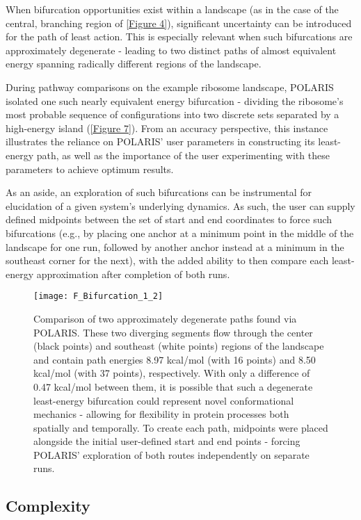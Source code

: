 \documentclass[twocolumn]{biophys-new}
\begin{document}
When bifurcation opportunities exist within a landscape (as in the case of the central, branching region of \autoref{Figure 4}), significant uncertainty can be introduced for the path of least action. This is especially relevant when such bifurcations are approximately degenerate - leading to two distinct paths of almost equivalent energy spanning radically different regions of the landscape.

During pathway comparisons on the example ribosome landscape, POLARIS isolated one such nearly equivalent energy bifurcation - dividing the ribosome's most probable sequence of configurations into two discrete sets separated by a high-energy island (\autoref{Figure 7}). From an accuracy perspective, this instance illustrates the reliance on POLARIS' user parameters in constructing its least-energy path, as well as the importance of the user experimenting with these parameters to achieve optimum results.

As an aside, an exploration of such bifurcations can be instrumental for elucidation of a given system's underlying dynamics. As such, the user can supply defined midpoints between the set of start and end coordinates to force such bifurcations (e.g., by placing one anchor at a minimum point in the middle of the landscape for one run, followed by another anchor instead at a minimum in the southeast corner for the next), with the added ability to then compare each least-energy approximation after completion of both runs.

\setcounter{figure}{6} 
\begin{figure}[hbt!]
\centering
\texttt{[image: F\_Bifurcation\_1\_2]}
\caption{Comparison of two approximately degenerate paths found via POLARIS. These two diverging segments flow through the center (black points) and southeast (white points) regions of the landscape and contain path energies 8.97 kcal/mol (with 16 points) and 8.50 kcal/mol (with 37 points), respectively. With only a difference of 0.47 kcal/mol between them, it is possible that such a degenerate least-energy bifurcation could represent novel conformational mechanics - allowing for flexibility in protein processes both spatially and temporally. To create each path, midpoints were placed alongside the initial user-defined start and end points - forcing POLARIS' exploration of both routes independently on separate runs.}
\label{Figure 7}
\end{figure}

\subsection*{Complexity}
\end{document}
